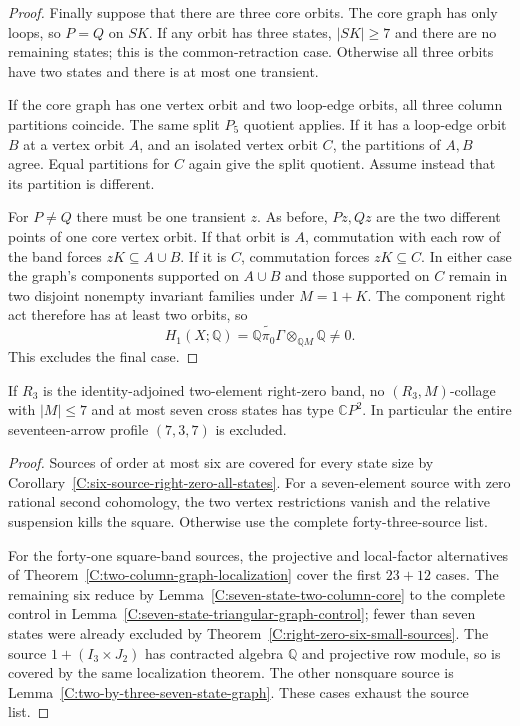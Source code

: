 \begin{proof}
Finally suppose that there are three core orbits.
The core graph has only loops, so $P=Q$ on $SK$.
If any orbit has three states, $|SK|\geq7$ and there
are no remaining states; this is the common-retraction
case.  Otherwise all three orbits have two states and
there is at most one transient.

If the core graph has one vertex orbit and two loop-edge
orbits, all three column partitions coincide.  The same
split $P_5$ quotient applies.  If it has a loop-edge
orbit $B$ at a vertex orbit $A$, and an isolated vertex
orbit $C$, the partitions of $A,B$ agree.  Equal
partitions for $C$ again give the split quotient.
Assume instead that its partition is different.

For $P\ne Q$ there must be one transient $z$.
As before, $Pz,Qz$ are the two different points of
one core vertex orbit.  If that orbit is $A$,
commutation with each row of the band forces
$zK\subseteq A\cup B$.  If it is $C$, commutation
forces $zK\subseteq C$.  In either case the graph's
components supported on $A\cup B$ and those supported
on $C$ remain in two disjoint nonempty invariant
families under $M=1+K$.  The component right act
therefore has at least two orbits, so
\[
 H_1(X;\mathbb Q)
   =\widetilde{\mathbb Q\pi_0\Gamma}
      \otimes_{\mathbb QM}\mathbb Q\ne0.
\]
This excludes the final case.
\end{proof}

\begin{theorem}
\label{C:seven-source-seven-state-right-zero}
If $R_3$ is the identity-adjoined two-element right-zero
band, no $(R_3,M)$-collage with $|M|\leq7$ and at most
seven cross states has type $\mathbb CP^2$.
In particular the entire seventeen-arrow profile
$(7,3,7)$ is excluded.
\end{theorem}
\begin{proof}
Sources of order at most six are covered for every
state size by
Corollary~\ref{C:six-source-right-zero-all-states}.
For a seven-element source with zero rational second
cohomology, the two vertex restrictions vanish and
the relative suspension kills the square.
Otherwise use the complete forty-three-source list.

For the forty-one square-band sources, the projective
and local-factor alternatives of
Theorem~\ref{C:two-column-graph-localization} cover the
first $23+12$ cases.  The remaining six reduce by
Lemma~\ref{C:seven-state-two-column-core} to the complete
control in Lemma~\ref{C:seven-state-triangular-graph-control};
fewer than seven states were already excluded by
Theorem~\ref{C:right-zero-six-small-sources}.
The source $1+(I_3\times J_2)$ has contracted algebra
$\mathbb Q$ and projective row module, so is covered
by the same localization theorem.  The other nonsquare
source is Lemma~\ref{C:two-by-three-seven-state-graph}.
These cases exhaust the source list.
\end{proof}
